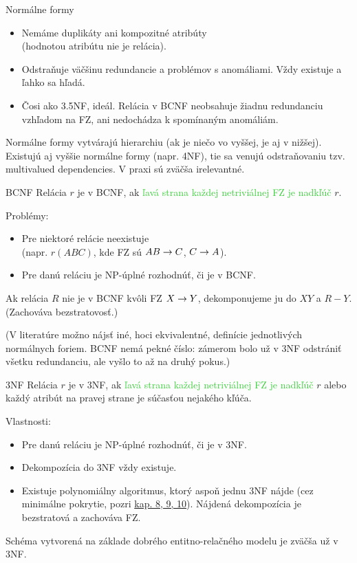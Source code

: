 \documentclass[12pt]{beamer}
\def\green#1{\textcolor{LimeGreen}{#1}}
\begin{document}
\begin{frame}[fragile]{Normálne formy}
\begin{itemize}
\item[\alert{1NF}] Nemáme duplikáty ani kompozitné atribúty\\ (hodnotou atribútu nie je relácia).
\item[\alert{3NF}] Odstraňuje väčšinu redundancie a problémov s anomáliami. Vždy existuje a ľahko sa hľadá.
\item[\alert{BCNF}] Čosi ako 3.5NF, ideál. Relácia v BCNF neobsahuje žiadnu redundanciu vzhľadom na FZ, ani nedochádza k spomínaným anomáliám.
\end{itemize}
Normálne formy vytvárajú hierarchiu (ak je niečo vo vyššej, je aj v nižšej).
Existujú aj vyššie normálne formy (napr. 4NF), tie sa venujú odstraňovaniu tzv. multivalued dependencies.
V praxi sú zväčša irelevantné.
\end{frame}

\begin{frame}[fragile]{BCNF}
Relácia $r$ je v BCNF, ak \green{ľavá strana každej netriviálnej FZ je nadkľúč} $r$.

\bigskip
Problémy:
\begin{itemize}
\item Pre niektoré relácie neexistuje\\ (napr. $r(ABC)$, kde FZ sú $AB\rightarrow C$, $C\rightarrow A$).
\item Pre danú reláciu je NP-úplné rozhodnúť, či je v BCNF.
\end{itemize}

\bigskip
Ak relácia $R$ nie je v BCNF kvôli FZ $X\rightarrow Y$, dekomponujeme ju do $XY$ a $R-Y$.
(Zachováva bezstratovosť.)

(V literatúre možno nájsť iné, hoci ekvivalentné, definície jednotlivých normálnych foriem.
BCNF nemá pekné číslo: zámerom bolo už v 3NF odstrániť všetku redundanciu,
ale vyšlo to až na druhý pokus.)
\end{frame}

\begin{frame}[fragile]{3NF}
Relácia $r$ je v 3NF, ak \green{ľavá strana každej netriviálnej FZ je nadkľúč} $r$
alebo každý atribút na pravej strane je súčasťou nejakého kľúča.

\bigskip
Vlastnosti:
\begin{itemize}
\item Pre danú reláciu je NP-úplné rozhodnúť, či je v 3NF.
\item Dekompozícia do 3NF vždy existuje.
\item Existuje polynomiálny algoritmus, ktorý aspoň jednu 3NF nájde (cez minimálne pokrytie, pozri
{\scriptsize\href{https://www.inf.usi.ch/faculty/soule/teaching/2016-fall/db/cover.pdf}{kap. 8, 9, 10}}).
Nájdená dekompozícia je bezstratová a zachováva FZ.
\end{itemize}

\bigskip
Schéma vytvorená na základe dobrého entitno-relačného modelu je zväčša už v 3NF.
\end{frame}
\end{document}
